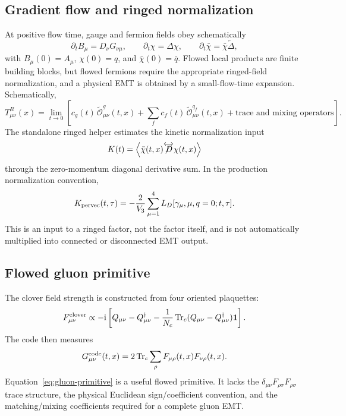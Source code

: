 \documentclass[11pt,a4paper]{article}
\numberwithin{equation}{section}
\newcommand{\ii}{\mathrm{i}}
\newcommand{\Tr}{\operatorname{Tr}}
\newcommand{\avg}[1]{\left\langle #1\right\rangle}
\newcommand{\cO}{\mathcal{O}}
\newcommand{\slDlr}{\overleftrightarrow{\not\!D}}
\begin{document}
\subsection{Gradient flow and ringed normalization}

At positive flow time, gauge and fermion fields obey schematically
\begin{equation}
 \partial_t B_\mu=D_\nu G_{\nu\mu},\qquad
 \partial_t\chi=\Delta\chi,\qquad
 \partial_t\bar\chi=\bar\chi\overleftarrow\Delta,
 \label{eq:gradient-flow}
\end{equation}
with \(B_\mu(0)=A_\mu\), \(\chi(0)=q\), and \(\bar\chi(0)=\bar q\).  Flowed
local products are finite building blocks, but flowed fermions require the
appropriate ringed-field normalization, and a physical EMT is obtained by a
small-flow-time expansion.  Schematically,
\begin{equation}
 T_{\mu\nu}^{R}(x)
 =\lim_{t\to0}\left[
 c_g(t)\,\widetilde{\cO}_{\mu\nu}^g(t,x)
 +\sum_f c_f(t)\,\widetilde{\cO}_{\mu\nu}^{q_f}(t,x)
 +\text{trace and mixing operators}
 \right].
 \label{eq:small-flow-time}
\end{equation}
The standalone ringed helper estimates the kinetic normalization input
\begin{equation}
 K(t)
 =\avg{\bar\chi(t,x)\slDlr\chi(t,x)}
 \end{equation}
through the zero-momentum diagonal derivative sum.  In the production
normalization convention,
\begin{equation}
 K_{\rm pervec}(t,\tau)
 =-\frac{2}{V_3}
 \sum_{\mu=1}^{4}
 L_D[\gamma_\mu,\mu,q=0;t,\tau].
 \label{eq:ringed-kinetic}
\end{equation}
This is an input to a ringed factor, not the factor itself, and is not
automatically multiplied into connected or disconnected EMT output.

\subsection{Flowed gluon primitive}

The clover field strength is constructed from four oriented plaquettes:
\begin{equation}
 F_{\mu\nu}^{\rm clover}
 \propto -\ii\left[
 Q_{\mu\nu}-Q_{\mu\nu}^\dagger
 -\frac1{N_c}\Tr_c(Q_{\mu\nu}-Q_{\mu\nu}^\dagger)\mathbf1
 \right].
\end{equation}
The code then measures
\begin{equation}
 G_{\mu\nu}^{\rm code}(t,x)
 =2\Tr_c\sum_{\rho}F_{\mu\rho}(t,x)F_{\nu\rho}(t,x).
 \label{eq:gluon-primitive}
\end{equation}
Equation~\eqref{eq:gluon-primitive} is a useful flowed primitive.  It lacks
the \(\delta_{\mu\nu}F_{\rho\sigma}F_{\rho\sigma}\) trace structure, the
physical Euclidean sign/coefficient convention, and the matching/mixing
coefficients required for a complete gluon EMT.
\end{document}
